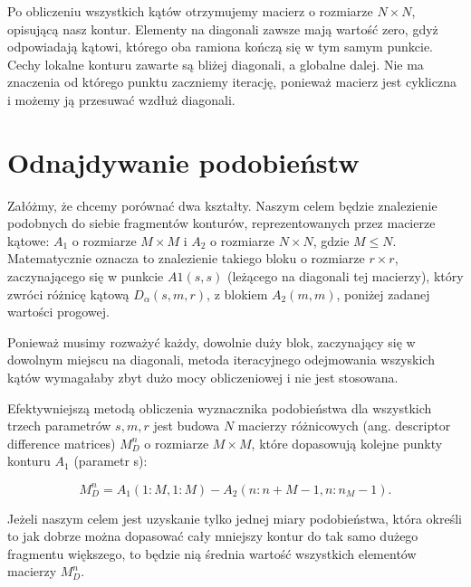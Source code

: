 Po obliczeniu wszystkich kątów otrzymujemy macierz o rozmiarze $N \times N$,
opisującą nasz kontur. Elementy na diagonali zawsze mają wartość zero, gdyż
odpowiadają kątowi, którego oba ramiona kończą się w tym samym punkcie. Cechy
lokalne konturu zawarte są bliżej diagonali, a globalne dalej. Nie ma znaczenia
od którego punktu zaczniemy iterację, ponieważ macierz jest cykliczna i możemy
ją przesuwać wzdłuż diagonali.


\section{Odnajdywanie podobieństw}

Załóżmy, że chcemy porównać dwa kształty. Naszym celem będzie znalezienie
podobnych do siebie fragmentów konturów, reprezentowanych przez macierze
kątowe: $A_{1}$ o rozmiarze $M \times M$ i $A_{2}$ o rozmiarze $N \times N$,
gdzie $M \leq N$.  Matematycznie oznacza to znalezienie takiego bloku o
rozmiarze $r \times r$, zaczynającego się w punkcie $A1(s,s)$ (leżącego na
diagonali tej macierzy), który zwróci różnicę kątową $D_{\alpha}(s,m,r)$, z
blokiem $A_{2}(m,m)$, poniżej zadanej wartości progowej. 


Ponieważ musimy rozważyć każdy, dowolnie duży blok, zaczynający się w dowolnym
miejscu na diagonali, metoda iteracyjnego odejmowania wszyskich kątów
wymagałaby zbyt dużo mocy obliczeniowej i nie jest stosowana.

Efektywniejszą metodą obliczenia wyznacznika podobieństwa dla wszystkich trzech
parametrów $s,m,r$ jest budowa $N$ macierzy różnicowych (ang. descriptor
difference matrices) $M_{D}^{n}$ o rozmiarze $M \times M$, które dopasowują
kolejne punkty konturu $A_{1}$ (parametr s):

\begin{equation}
  M_{D}^{n} = A_{1}(1: M, 1: M) - A_{2}(n: n+M-1, n:n_M-1).
\end{equation}

Jeżeli naszym celem jest uzyskanie tylko jednej miary podobieństwa, która
określi to jak dobrze można dopasować cały mniejszy kontur do tak samo dużego
fragmentu większego, to będzie nią średnia wartość wszystkich elementów
macierzy $M_{D}^{n}$.

